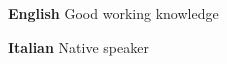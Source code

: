 \begin{cventries}
  \cventry
    {}
    {}
    {}
    {}
    {
      \begin{cvitems}
        \item {\textbf{English} Good working knowledge}
        \item {\textbf{Italian} Native speaker}
      \end{cvitems}
    }
\end{cventries}